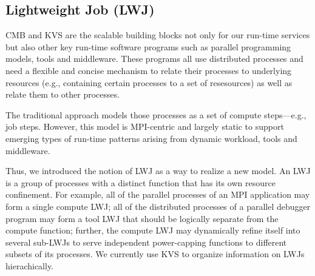 \subsection{Lightweight Job (LWJ)}
CMB and KVS are the scalable building blocks not only for our run-time services 
but also other key run-time software programs such as parallel programming models, 
tools and middleware. These programs all use distributed processes and need a 
flexible and concise mechanism to relate their processes to underlying resources 
(e.g., containing certain processes to a set of resesources) as well as relate 
them to other processes. 

The traditional approach models those processes as
a set of compute steps---e.g., job steps. However, this model 
is MPI-centric and largely static to support emerging types
of run-time patterns arising from dynamic workload, tools and middleware.

Thus, we introduced the notion of LWJ as a way to realize a new model.
An LWJ is a group
of processes with a distinct function that has its own resource confinement. 
For example, all of the parallel
processes of an MPI application may form a single compute LWJ; all of the distributed processes
of a parallel debugger program may form a tool LWJ that should be logically separate from the
compute function; further, the compute LWJ may dynamically refine itself into several 
sub-LWJs to serve independent power-capping functions to different subsets of its processes.
We currently use KVS to organize information on LWJs hierachically.
